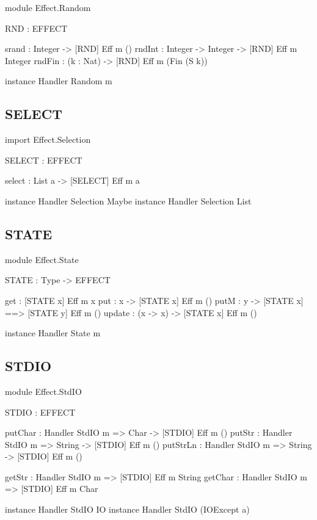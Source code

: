 \begin{code}
module Effect.Random

RND : EFFECT

srand  : Integer ->            { [RND] } Eff m ()
rndInt : Integer -> Integer -> { [RND] } Eff m Integer
rndFin : (k : Nat) ->          { [RND] } Eff m (Fin (S k))

instance Handler Random m
\end{code}

\subsection{SELECT}

\begin{code}
import Effect.Selection

SELECT : EFFECT

select : List a -> { [SELECT] } Eff m a 

instance Handler Selection Maybe
instance Handler Selection List
\end{code}


\subsection{STATE}

\begin{code}
module Effect.State

STATE : Type -> EFFECT

get    :             { [STATE x] } Eff m x
put    : x ->        { [STATE x] } Eff m () 
putM   : y ->        { [STATE x] ==> [STATE y] } Eff m () 
update : (x -> x) -> { [STATE x] } Eff m () 

instance Handler State m
\end{code}

\subsection{STDIO}

\begin{code}
module Effect.StdIO

STDIO : EFFECT

putChar  : Handler StdIO m => Char ->   { [STDIO] } Eff m ()
putStr   : Handler StdIO m => String -> { [STDIO] } Eff m ()
putStrLn : Handler StdIO m => String -> { [STDIO] } Eff m ()

getStr   : Handler StdIO m =>           { [STDIO] } Eff m String
getChar  : Handler StdIO m =>           { [STDIO] } Eff m Char

instance Handler StdIO IO
instance Handler StdIO (IOExcept a)
\end{code}

